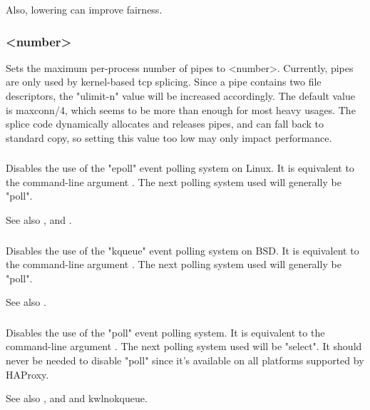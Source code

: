 Also, lowering  can improve fairness.

\subsubsection[maxpipes]{ <number>}
Sets the maximum per-process number of pipes to <number>. Currently, pipes
are only used by kernel-based tcp splicing. Since a pipe contains two file
descriptors, the "ulimit-n" value will be increased accordingly. The default
value is maxconn/4, which seems to be more than enough for most heavy usages.
The splice code dynamically allocates and releases pipes, and can fall back
to standard copy, so setting this value too low may only impact performance.

\subsubsection[noepoll]{}

Disables the use of the "epoll" event polling system on Linux. It is
equivalent to the command-line argument . The next polling system
used will generally be "poll".

See also , and .

\subsubsection[nokqueue]{}

Disables the use of the "kqueue" event polling system on BSD. It is
equivalent to the command-line argument . The next polling system
used will generally be "poll".

See also .

\subsubsection[nopoll]{}

Disables the use of the "poll" event polling system. It is equivalent to the
command-line argument . The next polling system used will be "select".
It should never be needed to disable "poll" since it's available on all
platforms supported by HAProxy.

See also , and  and kwl{nokqueue}.

\subsubsection[nosepoll]{}

